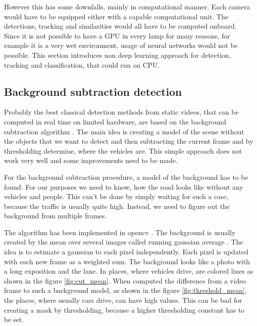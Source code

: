 \documentclass[a4paper,12pt,titlepage, twoside]{article}
\numberwithin{figure}{section}
\begin{document}
However this has some downfalls, mainly in computational manner. Each camera would have to be equipped either with a capable computational unit. The detections, tracking and similarities would all have to be computed onboard. Since it is not possible to have a GPU in every lamp for many reasons, for example it is a very wet environment, usage of neural networks would not be possible. This section introduces non deep learning approach for detection, tracking and classification, that could run on CPU.



\subsection{Background subtraction detection}
\label{sec:bgs}

Probably the best classical detection methods from static videos, that can be computed in real time on limited hardware, are based on the background subtraction algorithm \cite{piccardi2004background}. The main idea is creating a model of the scene without the objects that we want to detect and then subtracting the current frame and by thresholding determine, where the vehicles are. This simple approach does not work very well and some improvements need to be made. 

For the background subtraction procedure, a model of the background has to be found. For our purposes we need to know, how the road looks like without any vehicles and people. This can't be done by simply waiting for such a case, because the traffic is usually quite high. Instead, we need to figure out the background from multiple frames. 

\cite{horprasert1999statistical, zivkovic2006efficient}

The algorithm has been implemented in opencv \cite{opencv}. The background is usually created by the mean over several images called running gaussian average \cite{wren1997pfinder}. The idea is to estimate a gaussian to each pixel independently. Each pixel is updated with each new frame as a weighted sum. The background looks like a photo with a long exposition and the lane. In places, where vehicles drive, are colored lines as shown in the figure \ref{fig:cut_mean}. When computed the difference from a video frame to such a background model, as shown in the figure \ref{fig:threshold_mean}, the places, where usually cars drive, can have high values. This can be bad for creating a mask by thresholding, because a higher thresholding constant has to be set.
\end{document}
